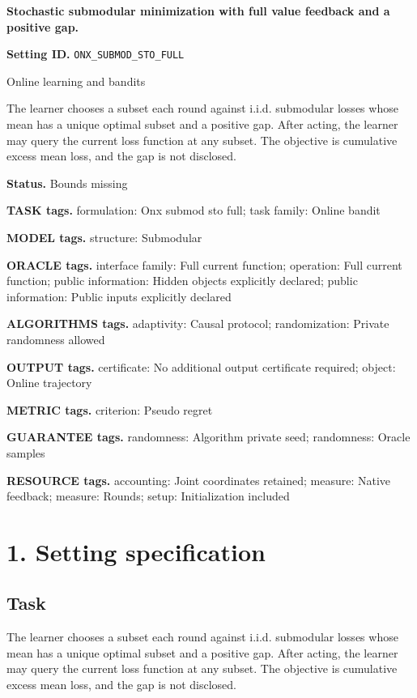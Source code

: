 \documentclass[10pt,a4paper]{article}
\begin{document}
\raggedright

{\LARGE\bfseries\sffamily\color{AtlasNavy} Stochastic submodular minimization with full value feedback and a positive gap.\par}\vspace{5pt}
\textbf{Setting ID.} \texttt{ONX\_\allowbreak{}SUBMOD\_\allowbreak{}STO\_\allowbreak{}FULL}

Online learning and bandits

The learner chooses a subset each round against i.i.d. submodular losses whose mean has a unique optimal subset and a positive gap. After acting, the learner may query the current loss function at any subset. The objective is cumulative excess mean loss, and the gap is not disclosed.

\textbf{Status.} Bounds missing

\textbf{TASK tags.} formulation: Onx submod sto full; task family: Online bandit

\textbf{MODEL tags.} structure: Submodular

\textbf{ORACLE tags.} interface family: Full current function; operation: Full current function; public information: Hidden objects explicitly declared; public information: Public inputs explicitly declared

\textbf{ALGORITHMS tags.} adaptivity: Causal protocol; randomization: Private randomness allowed

\textbf{OUTPUT tags.} certificate: No additional output certificate required; object: Online trajectory

\textbf{METRIC tags.} criterion: Pseudo regret

\textbf{GUARANTEE tags.} randomness: Algorithm private seed; randomness: Oracle samples

\textbf{RESOURCE tags.} accounting: Joint coordinates retained; measure: Native feedback; measure: Rounds; setup: Initialization included

\section{1. Setting specification}
\subsection{Task}
The learner chooses a subset each round against i.i.d. submodular losses whose mean has a unique optimal subset and a positive gap. After acting, the learner may query the current loss function at any subset. The objective is cumulative excess mean loss, and the gap is not disclosed.
\end{document}
